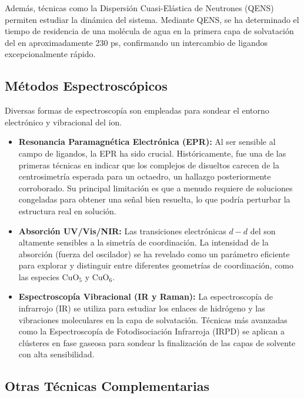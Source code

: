 Además, técnicas como la Dispersión Cuasi-Elástica de Neutrones (QENS) permiten estudiar la dinámica del sistema. Mediante QENS, se ha determinado el tiempo de residencia de una molécula de agua en la primera capa de solvatación del  en aproximadamente 230 ps, confirmando un intercambio de ligandos excepcionalmente rápido.

\subsection{Métodos Espectroscópicos}

Diversas formas de espectroscopía son empleadas para sondear el entorno electrónico y vibracional del ion.
\begin{itemize}
    \item \textbf{Resonancia Paramagnética Electrónica (EPR):} Al ser sensible al campo de ligandos, la EPR ha sido crucial. Históricamente, fue una de las primeras técnicas en indicar que los complejos de  disueltos carecen de la centrosimetría esperada para un octaedro, un hallazgo posteriormente corroborado. Su principal limitación es que a menudo requiere de soluciones congeladas para obtener una señal bien resuelta, lo que podría perturbar la estructura real en solución.
    \item \textbf{Absorción UV/Vis/NIR:} Las transiciones electrónicas $d-d$ del  son altamente sensibles a la simetría de coordinación. La intensidad de la absorción (fuerza del oscilador) se ha revelado como un parámetro eficiente para explorar y distinguir entre diferentes geometrías de coordinación, como las especies CuO$_5$ y CuO$_6$.
    \item \textbf{Espectroscopía Vibracional (IR y Raman):} La espectroscopía de infrarrojo (IR) se utiliza para estudiar los enlaces de hidrógeno y las vibraciones moleculares en la capa de solvatación. Técnicas más avanzadas como la Espectroscopía de Fotodisociación Infrarroja (IRPD) se aplican a clústeres en fase gaseosa para sondear la finalización de las capas de solvente con alta sensibilidad.
\end{itemize}

\subsection{Otras Técnicas Complementarias}

